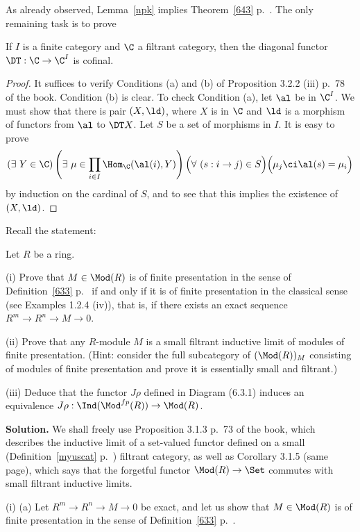 \documentclass[12pt]{article}
\theoremstyle{remark}
\theoremstyle{definition}
\begin{document}
As already observed, Lemma~\ref{npk} implies Theorem~\ref{643} p.~. The only remaining task is to prove 

\begin{lem}
If $I$ is a finite category and $\C$ a filtrant category, then the diagonal functor $\DT:\C\to\C^I$ is cofinal.
\end{lem}

\begin{proof}
It suffices to verify Conditions (a) and (b) of Proposition 3.2.2 (iii) p.~78 of the book. Condition (b) is clear. To check Condition (a), let $\al$ be in $\C^I$. We must show that there is pair $(X,\ld)$, where $X$ is in $\C$ and $\ld$ is a morphism of functors from $\al$ to $\DT X$. Let $S$ be a set of morphisms in $I$. It is easy to prove 
$$
(\exists\ Y\in\C)\left(\exists\ \mu\in\prod_{i\in I}\Hom_\C(\al(i),Y)\right)\Big(\forall\ (s:i\to j)\in S\Big)\Big(\mu_{j}\ci\al(s)=\mu_i\Big) 
$$ 
by induction on the cardinal of $S$, and to see that this implies the existence of $(X,\ld)$.
\end{proof} 



Recall the statement: 

Let $R$ be a ring.

\nn(i) Prove that $M\in\Mod(R)$ is of finite presentation in the sense of Definition~\ref{633} p.~ if and only if it is of finite presentation in the classical sense (see Examples 1.2.4 (iv)), that is, if there exists an exact sequence $R^m\to R^n\to M\to0$.

\nn(ii) Prove that any $R$-module $M$ is a small filtrant inductive limit of modules of finite presentation. (Hint: consider the full subcategory of $(\Mod(R))_M$ consisting of modules of finite presentation and prove it is essentially small and filtrant.)

\nn(iii) Deduce that the functor $J\rho$ defined in Diagram (6.3.1) induces an equivalence $J\rho:\Ind(\Mod^{fp}(R))\to\Mod(R)$.

\nn\textbf{Solution.} We shall freely use Proposition 3.1.3 p.~73 of the book, which describes the inductive limit of a set-valued functor defined on a small (Definition~\ref{myuscat} p.~) filtrant category, as well as Corollary 3.1.5 (same page), which says that the forgetful functor $\Mod(R)\to\Set$ commutes with small filtrant inductive limits.

\nn(i) (a) Let $R^m\to R^n\to M\to0$ be exact, and let us show that $M\in\Mod(R)$ is of finite presentation in the sense of Definition~\ref{633} p.~. 
\end{document}
